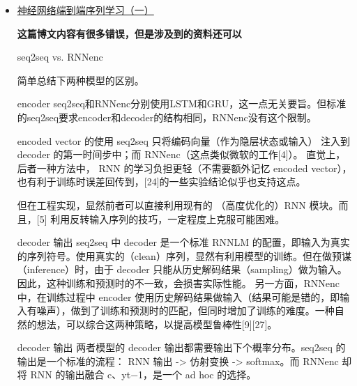 \documentclass[UTF8,10pt,a4paper]{ctexbook}
\begin{document}
\begin{itemize}
\item \href{http://blog.csdn.net/jackytintin/article/details/53352063}{神经网络端到端序列学习（一）}

\textbf{这篇博文内容有很多错误，但是涉及到的资料还可以}

seq2seq vs. RNNenc

简单总结下两种模型的区别。

\subitem encoder 
    \subsubitem seq2seq和RNNenc分别使用LSTM和GRU，这一点无关要旨。但标准的seq2seq要求encoder和decoder的结构相同，RNNenc没有这个限制。

\subitem encoded vector 的使用 
    \subsubitem seq2seq 只将编码向量（作为隐层状态或输入） 注入到 decoder 的第一时间步中；而 RNNenc（这点类似微软的工作[4]）。 
                直觉上，后者一种方法中， RNN 的学习负担更轻（不需要额外记忆 encoded vector），也有利于训练时误差回传到，[24]的一些实验结论似乎也支持这点。

    \subsubitem 但在工程实现，显然前者可以直接利用现有的 （高度优化的）RNN 模块。而且，[5] 利用反转输入序列的技巧，一定程度上克服可能困难。

\subitem decoder 输出 
\subsubitem seq2seq 中 decoder 是一个标准 RNNLM 的配置，即输入为真实的序列符号。使用真实的（clean）序列，显然有利用模型的训练。但在做预谋（inference）时，由于 decoder 只能从历史解码结果（sampling）做为输入。因此，这种训练和预测时的不一致，会损害实际性能。 
\subsubitem 另一方面，RNNenc 中，在训练过程中 encoder 使用历史解码结果做输入（结果可能是错的，即输入有噪声），做到了训练和预测时的匹配，但同时增加了训练的难度。一种自然的想法，可以综合这两种策略，以提高模型鲁棒性[9][27]。

decoder 输出 
两者模型的 decoder 输出都需要输出下个概率分布。seq2seq 的输出是一个标准的流程： RNN 输出 -> 仿射变换 -> softmax。而 RNNenc 却将 RNN 的输出融合 c、yt−1，是一个 ad hoc 的选择。


\end{itemize}
\end{document}

